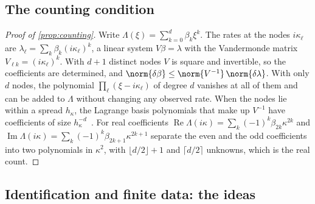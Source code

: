 \subsection{The counting condition}\label{sm:proof-counting}
\begin{proof}[Proof of \cref{prop:counting}]
Write $\Lambda(\xi)=\sum_{k=0}^d\beta_k\xi^k$. The rates at the nodes $i\kappa_\ell$ are
$\lambda_\ell=\sum_k\beta_k(i\kappa_\ell)^k$, a linear system $V\beta=\lambda$ with the Vandermonde matrix
$V_{\ell k}=(i\kappa_\ell)^k$. With $d+1$ distinct nodes $V$ is square and invertible, so the coefficients are determined, and
$\norm{\delta\beta}\le\norm{V^{-1}}\,\norm{\delta\lambda}$. With only $d$ nodes, the polynomial
$\prod_\ell(\xi-i\kappa_\ell)$ of degree $d$ vanishes at all of them and can be added to $\Lambda$ without changing any
observed rate. When the nodes lie within a spread $h_\kappa$, the Lagrange basis polynomials that make up $V^{-1}$ have
coefficients of size $h_\kappa^{-d}$~\cite{Gau62}. For real coefficients
$\operatorname{Re}\Lambda(i\kappa)=\sum_k(-1)^k\beta_{2k}\kappa^{2k}$ and
$\operatorname{Im}\Lambda(i\kappa)=\sum_k(-1)^k\beta_{2k+1}\kappa^{2k+1}$ separate the even and the odd coefficients into
two polynomials in $\kappa^2$, with $\lfloor d/2\rfloor+1$ and $\lceil d/2\rceil$ unknowns, which is the real count.
\end{proof}

\subsection{Identification and finite data: the ideas}\label{sm:ident}
